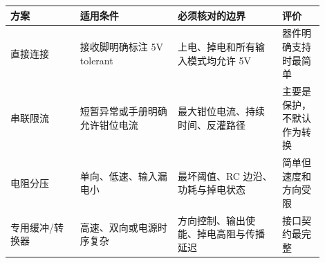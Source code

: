 \begin{longtable}{L{0.20\linewidth}L{0.28\linewidth}L{0.30\linewidth}L{0.12\linewidth}}
\toprule
方案 & 适用条件 & 必须核对的边界 & 评价 \\
\midrule
直接连接 & 接收脚明确标注 5V tolerant & 上电、掉电和所有输入模式均允许 5V & 器件明确支持时最简单 \\\tablerowrule
串联限流 & 短暂异常或手册明确允许钳位电流 & 最大钳位电流、持续时间、反灌路径 & 主要是保护，不默认作为转换 \\\tablerowrule
电阻分压 & 单向、低速、输入漏电小 & 最坏阈值、RC 边沿、功耗与掉电状态 & 简单但速度和方向受限 \\\tablerowrule
专用缓冲/转换器 & 高速、双向或电源时序复杂 & 方向控制、输出使能、掉电高阻与传播延迟 & 接口契约最完整 \\
\bottomrule
\end{longtable}
